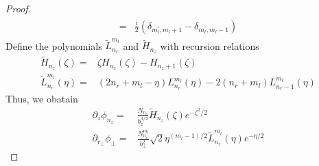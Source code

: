 \begin{proof}
\begin{align}
\begin{aligned}
        =&\frac{i}{2} (\delta _{m_{l}^{\prime},m_{l}+1} - \delta_{m_{l}^{\prime},m_{l}-1} )
      \end{aligned}
    \end{align}
    Define the polynomials $\tilde{L}_{n_r}^{m_l}$ and $\tilde{H}_{n_z}$ with recursion relations
    \begin{align}
      \tilde{H}_{n_z}(\zeta) =& \zeta H_{n_z}(\zeta) - H_{n_z+1}(\zeta) \label{oc_Hermite_recur} \\ 
      \tilde{L}_{n_r}^{m_l}(\eta) =& (2n_r + m_l - \eta) L_{n_r}^{m_l}(\eta) - 2( n_r + m_l ) L_{n_r - 1}^{m_l}(\eta) \label{oc_L_first_der}
    \end{align}
    Thus, we obatain
    \begin{align}
      \partial_{z}\phi_{n_z} =& \frac{N_{n_z}}{b_z^{3/2}} \tilde{H}_{n_z}(\zeta)e^{-\zeta^2/2}\\
      \partial_{r_\perp}\phi_{\perp} =& \frac{N_{n_r}^{m_l}}{b_{\perp}^{2}}\sqrt{2} \eta^{(m_l - 1)/2} \tilde{L}_{n_r}^{m_l}(\eta) e^{-\eta/2}  \label{oc_phi_perp_one_firs_der}
    \end{align}


\end{proof}
